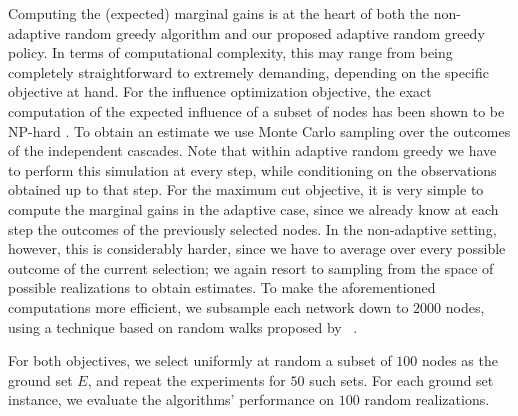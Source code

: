 \documentclass{article}
\newcommand{\citet}[1]{\citeauthor{#1}~\shortcite{#1}}
\begin{document}
Computing the (expected) marginal gains is at the heart of both the non-adaptive random greedy algorithm and our proposed adaptive random greedy policy.
In terms of computational complexity, this may range from being completely straightforward to extremely demanding, depending on the specific objective at hand.
For the influence optimization objective, the exact computation of the expected influence of a subset of nodes has been shown to be NP-hard \cite{kempe03}.
To obtain an estimate we use Monte Carlo sampling over the outcomes of the independent cascades.
Note that within adaptive random greedy we have to perform this simulation at every step, while conditioning on the observations obtained up to that step.
For the maximum cut objective, it is very simple to compute the marginal gains in the adaptive case, since we already know at each step the outcomes of the previously selected nodes.
In the non-adaptive setting, however, this is considerably harder, since we have to average over every possible outcome of the current selection; we again resort to sampling from the space of possible realizations to obtain estimates.
To make the aforementioned computations more efficient, we subsample each network down to $2000$ nodes, using a technique based on random walks proposed by \citet{leskovec06}.

For both objectives, we select uniformly at random a subset of $100$ nodes as the ground set $E$, and repeat the experiments for $50$ such sets.
For each ground set instance, we evaluate the algorithms' performance on $100$ random realizations.
\end{document}

